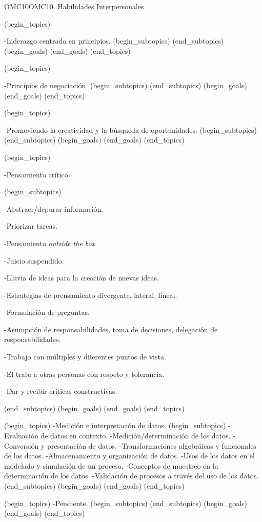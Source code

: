 \begin{BKL2}{OMC10}{OMC10. Habilidades Interpersonales}
 

(begin_topics)

-Liderazgo centrado en principios.
(begin_subtopics)
(end_subtopics)
(begin_goals)
(end_goals)
(end_topics)

 

(begin_topics)

-Principios de negociación.
(begin_subtopics)
(end_subtopics)
(begin_goals)
(end_goals)
(end_topics)

 

(begin_topics)

-Promoviendo la creatividad y la búsqueda de oportunidades.
(begin_subtopics)
(end_subtopics)
(begin_goals)
(end_goals)
(end_topics)

 

(begin_topics)

-Pensamiento crítico.

(begin_subtopics)

-Abstraer/depurar información.

-Priorizar tareas.

-Pensamiento {\it outside the box}.

-Juicio suspendido.

-Lluvia de ideas para la creación de nuevas ideas.

-Estrategias de prensamiento divergente, lateral, lineal.

-Formulación de preguntas.

-Asumpción de responsabilidades, toma de decisiones, delegación de responsabilidades.

-Trabajo con múltiples y diferentes puntos de vista.

-El trato a otras personas  con respeto y tolerancia.

-Dar y recibir críticas constructivas.

(end_subtopics)
(begin_goals)
(end_goals)
(end_topics)

 
(begin_topics)
-Medición e interpretación de datos.
(begin_subtopics)
-Evaluación de datos en contexto.
-Medición/determinación de los datos.
-Conversión y presentación de datos.
-Transformaciones algebráicas y funcionales de los datos.
-Almacenamiento y organización de datos.
-Usos de los datos en el modelado y simulación de un proceso.
-Conceptos de muestreo en la determinación de los datos.
-Validación de procesos a través del uso de los datos.
(end_subtopics)
(begin_goals)
(end_goals)
(end_topics)

(begin_topics)
-Pendiente.
(begin_subtopics)
(end_subtopics)
(begin_goals)
(end_goals)
(end_topics)


\end{BKL2}
